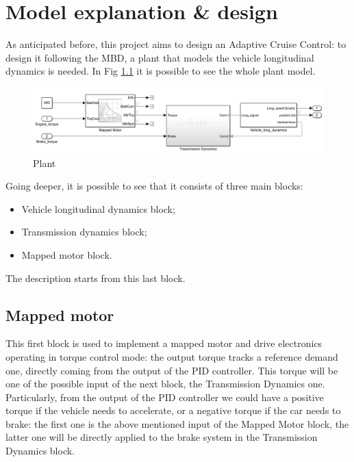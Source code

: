 \documentclass[12pt,a4paper]{report}
\begin{document}
\chapter{Model explanation \& design}
As anticipated before, this project aims to design an Adaptive Cruise Control: to design it following the MBD, a plant that models the vehicle longitudinal dynamics is needed.
In Fig \ref{Plant} it is possible to see the whole plant model.

\begin{figure}[htbp]
	\centering
	\includegraphics[scale=0.5]{Plant.jpg}
	\caption{Plant}
	\label{Plant}
\end{figure}


Going deeper, it is possible to see that it consists of three main blocks:

\begin{itemize}
	
	\item Vehicle longitudinal dynamics block;
	
	\item Transmission dynamics block;
	
	\item Mapped motor block.
	
\end{itemize}

The description starts from this last block.

\section{Mapped motor}

This first block is used to implement a mapped motor and drive electronics operating in torque control mode: the output torque tracks a reference demand one, directly coming from the output of the PID controller. This torque will be one of the possible input of the next block, the Transmission Dynamics one. Particularly, from the output of the PID controller we could have a positive torque if the vehicle needs to accelerate, or a negative torque if the car needs to brake: the first one is the above mentioned input of the Mapped Motor block, the latter one will be directly applied to the brake system in the Transmission Dynamics block.
\end{document}
